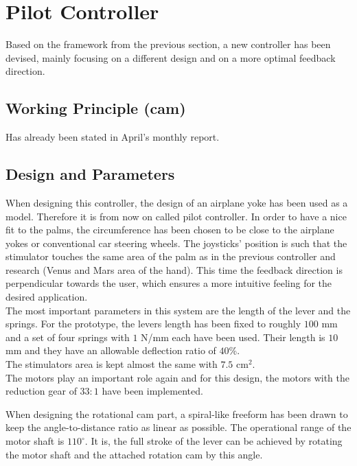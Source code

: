 
\section{Pilot Controller}
Based on the framework from the previous section, a new controller has been devised, mainly focusing on a different design and on a more optimal feedback direction.

\subsection{Working Principle (cam)}%
Has already been stated in April's monthly report.

\subsection{Design and Parameters}
When designing this controller, the design of an airplane yoke has been used as a model. Therefore it is from now on called pilot controller. In order to have a nice fit to the palms, the circumference has been chosen to be close to the airplane yokes or conventional car steering wheels. The joysticks' position is such that the stimulator touches the same area of the palm as in the previous controller and research (Venus and Mars area of the hand). This time the feedback direction is perpendicular towards the user, which ensures a more intuitive feeling for the desired application.\\
The most important parameters in this system are the length of the lever and the springs. For the prototype, the levers length has been fixed to roughly $100$ mm and a set of four springs with $1$ N/mm each have been used. Their length is $10$ mm and they have an allowable deflection ratio of $40$\%.\\
The stimulators area is kept almost the same with $7.5$ cm$^2$.\\
The motors play an important role again and for this design, the motors with the reduction gear of $33:1$ have been implemented.

When designing the rotational cam part, a spiral-like freeform has been drawn to keep the angle-to-distance ratio as linear as possible. The operational range of the motor shaft is $110 ^\circ$. It is, the full stroke of the lever can be achieved by rotating the motor shaft and the attached rotation cam by this angle.\\

